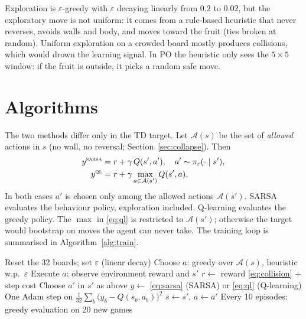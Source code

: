 \documentclass{article}
\begin{document}
Exploration is $\varepsilon$-greedy with $\varepsilon$ decaying linearly from $0.2$ to $0.02$, but the exploratory move is not uniform: it comes from a rule-based heuristic that never reverses, avoids walls and body, and moves toward the fruit (ties broken at random).
Uniform exploration on a crowded board mostly produces collisions, which would drown the learning signal.
In PO the heuristic only sees the $5\times5$ window: if the fruit is outside, it picks a random safe move.

\section{Algorithms}
\label{sec:algo}

The two methods differ only in the TD target.
Let $\mathcal{A}(s)$ be the set of \emph{allowed} actions in $s$ (no wall, no reversal; Section~\ref{sec:collapse}). Then
\begin{align}
y^{\textsc{sarsa}} &= r + \gamma\, Q(s',a'), \quad a' \sim \pi_\varepsilon(\cdot \mid s'), \label{eq:sarsa}\\
y^{\textsc{ql}} &= r + \gamma \max_{a \in \mathcal{A}(s')} Q(s',a). \label{eq:ql}
\end{align}
In both cases $a'$ is chosen only among the allowed actions $\mathcal{A}(s')$. SARSA evaluates the behaviour policy, exploration included. Q-learning evaluates the greedy policy.
The $\max$ in \eqref{eq:ql} is restricted to $\mathcal{A}(s')$; otherwise the target would bootstrap on moves the agent can never take.
The training loop is summarised in Algorithm~\ref{alg:train}.

\begin{algorithm}[tb]
   \caption{Training loop (shared by SARSA and Q-learning)}
   \label{alg:train}
\begin{algorithmic}
   \STATE Reset the 32 boards; set $\varepsilon$ (linear decay)
   \STATE Choose $a$: greedy over $\mathcal{A}(s)$, heuristic w.p.\ $\varepsilon$
   \STATE Execute $a$; observe environment reward and $s'$
   \STATE $r \leftarrow$ reward \eqref{eq:collision} $+$ step cost
   \STATE Choose $a'$ in $s'$ as above
   \STATE $y \leftarrow$ \eqref{eq:sarsa} (SARSA) or \eqref{eq:ql} (Q-learning)
   \STATE One Adam step on $\frac{1}{32}\sum_{b}\big(y_b - Q(s_b,a_b)\big)^2$
   \STATE $s \leftarrow s'$, $a \leftarrow a'$
   \ENDFOR
   \STATE Every 10 episodes: greedy evaluation on 20 new games
   \ENDFOR
\end{algorithmic}
\end{algorithm}
\end{document}
